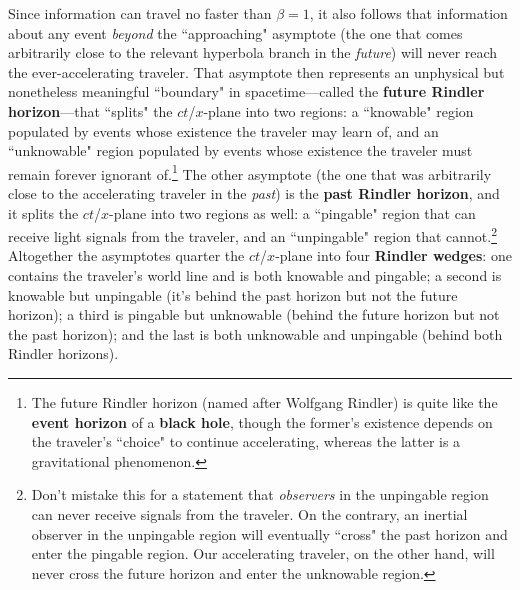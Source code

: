 \documentclass[12pt]{article}
\begin{document}
Since information can travel no faster than $\beta = 1$, it also follows that information about any event \emph{beyond} the ``approaching" asymptote (the one that comes arbitrarily close to the relevant hyperbola branch in the \emph{future}) will never reach the ever-accelerating traveler. That asymptote then represents an unphysical but nonetheless meaningful ``boundary" in spacetime---called the \textbf{future Rindler horizon}---that ``splits" the $ct$/$x$-plane into two regions: a ``knowable" region populated by events whose existence the traveler may learn of, and an ``unknowable" region populated by events whose existence the traveler must remain forever ignorant of.\footnote{The future Rindler horizon (named after Wolfgang Rindler) is quite like the \textbf{event horizon} of a \textbf{black hole}, though the former's existence depends on the traveler's ``choice" to continue accelerating, whereas the latter is a gravitational phenomenon.} The other asymptote (the one that was arbitrarily close to the accelerating traveler in the \emph{past}) is the \textbf{past Rindler horizon}, and it splits the $ct$/$x$-plane into two regions as well: a ``pingable" region that can receive light signals from the traveler, and an ``unpingable" region that cannot.\footnote{Don't mistake this for a statement that \emph{observers} in the unpingable region can never receive signals from the traveler. On the contrary, an inertial observer in the unpingable region will eventually ``cross" the past horizon and enter the pingable region. Our accelerating traveler, on the other hand, will never cross the future horizon and enter the unknowable region.} Altogether the asymptotes quarter the $ct$/$x$-plane into four \textbf{Rindler wedges}: one contains the traveler's world line and is both knowable and pingable; a second is knowable but unpingable (it's behind the past horizon but not the future horizon); a third is pingable but unknowable (behind the future horizon but not the past horizon); and the last is both unknowable and unpingable (behind both Rindler horizons).


%
%
%
\end{document}
